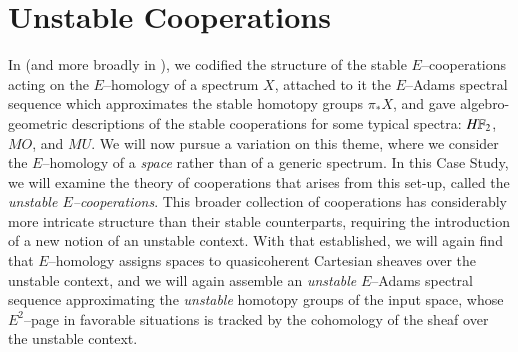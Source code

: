 
\chapter{Unstable Cooperations}\label{UnstableCooperationsChapter}


In  (and more broadly in ), we codified the structure of the stable $E$--cooperations acting on the $E$--homology of a spectrum $X$, attached to it the $E$--Adams spectral sequence which approximates the stable homotopy groups $\pi_* X$, and gave algebro-geometric descriptions of the stable cooperations for some typical spectra: $\HFtwo$, $MO$, and $MU$.  We will now pursue a variation on this theme, where we consider the $E$--homology of a \emph{space} rather than of a generic spectrum.  In this Case Study, we will examine the theory of cooperations that arises from this set-up, called the \textit{unstable $E$--cooperations}.  This broader collection of cooperations has considerably more intricate structure than their stable counterparts, requiring the introduction of a new notion of an unstable context.  With that established, we will again find that $E$--homology assigns spaces to quasicoherent Cartesian sheaves over the unstable context, and we will again assemble an \emph{unstable} $E$--Adams spectral sequence approximating the \emph{unstable} homotopy groups of the input space, whose $E^2$--page in favorable situations is tracked by the cohomology of the sheaf over the unstable context.

